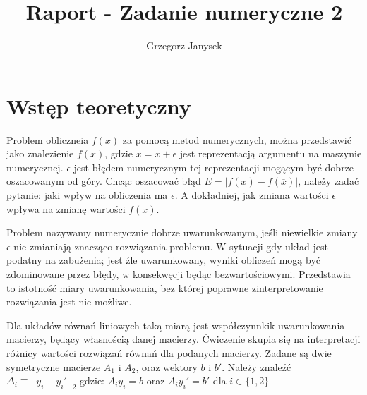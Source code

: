 \documentclass[11pt]{extarticle}
\author{Grzegorz Janysek}
\title{Raport - Zadanie numeryczne 2}
\begin{document}
	\maketitle

	\section{Wstęp teoretyczny}

	Problem obliczneia \( f(x) \) za pomocą metod numerycznych,
	można przedstawić jako znalezienie \( f(\overline{x} ) \), gdzie
	\( \overline{x} = x + \epsilon\) jest reprezentacją argumentu na maszynie numerycznej.
	\( \epsilon \) jest błędem numerycznym tej reprezentacji mogącym być dobrze oszacowanym od góry.
	Chcąc oszacować błąd \( E=|f(x) - f(\overline{x})|\), należy zadać pytanie: jaki wpływ na obliczenia ma \( \epsilon \).
	A dokładniej, jak zmiana wartości \( \epsilon \) wpływa na zmianę wartości \( f(\overline{x}) \).
	
	Problem nazywamy numerycznie dobrze uwarunkowanym,
	jeśli niewielkie zmiany \( \epsilon \) nie zmianiają znacząco rozwiązania problemu.
	W sytuacji gdy układ jest podatny na zabużenia; jest źle uwarunkowany,
	wyniki obliczeń mogą być zdominowane przez błędy, w konsekwęcji będąc bezwartościowymi.
	Przedstawia to istotność miary uwarunkowania, bez której poprawne zinterpretowanie rozwiązania jest nie możliwe. 
	
	Dla układów równań liniowych taką miarą jest współczynnkik uwarunkowania macierzy, będący własnością danej macierzy.
	Ćwiczenie skupia się na interpretacji różnicy wartości rozwiązań równań dla podanych macierzy.
	Zadane są dwie symetryczne macierze \( A_1 \) i \( A_2 \), oraz wektory \( b \) i \( b' \).
	Należy znaleźć \( \Delta_i \equiv ||y_i - y_i'||_2 \) gdzie: \( A_i y_i = b\) oraz \( A_i y_i' = b' \) dla \( i \in \{1, 2\}\)
	
\end{document}
